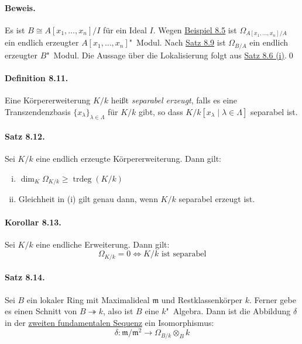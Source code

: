 \paragraph{Beweis.} Es ist $B \cong A[x_1,\ldots,x_n]/I$ für ein Ideal $I$. Wegen \hyperref[8.5]{Beispiel 8.5} ist $\Omega_{A[x_1,\ldots,x_n]/A}$ ein endlich erzeugter $A[x_1,\ldots,x_n]$"~Modul. Nach \hyperref[8.9]{Satz 8.9} ist $\Omega_{B/A}$ ein endlich erzeugter $B$"~Modul. Die Aussage über die Lokalisierung folgt aus \hyperref[8.6]{Satz 8.6 (i)}.\qed

\paragraph{Definition 8.11.}\label{8.11} Eine Körpererweiterung $K/k$ heißt \textit{separabel erzeugt}, falls es eine Transzendenzbasis $\{x_\lambda\}_{\lambda\in\Lambda}$ für $K/k$ gibt, so dass $K/k[x_\lambda\mid \lambda\in\Lambda]$ separabel ist.

\paragraph{Satz 8.12.}\label{8.12} Sei $K/k$ eine endlich erzeugte Körpererweiterung. Dann gilt:
\begin{enumerate}[(i)]
\item $\dim_K\Omega_{K/k}\geq \operatorname{trdeg}(K/k)$
\item Gleichheit in (i) gilt genau dann, wenn $K/k$ separabel erzeugt ist.
\end{enumerate}

\paragraph{Korollar 8.13.}\label{8.13} Sei $K/k$ eine endliche Erweiterung. Dann gilt:
\[\Omega_{K/k}=0\iff K/k\text{ ist separabel} \]

\paragraph{Satz 8.14.}\label{8.14} Sei $B$ ein lokaler Ring mit Maximalideal $\mathfrak{m}$ und Restklassenkörper $k$. Ferner gebe es einen Schnitt von $B\twoheadrightarrow k$, also ist $B$ eine $k$"~Algebra. Dann ist die Abbildung $\delta$ in der \hyperref[8.9]{zweiten fundamentalen Sequenz} ein Isomorphismus:
\[\delta:\mathfrak{m}/\mathfrak{m}^2\to \Omega_{B/k}\otimes_B k \]

